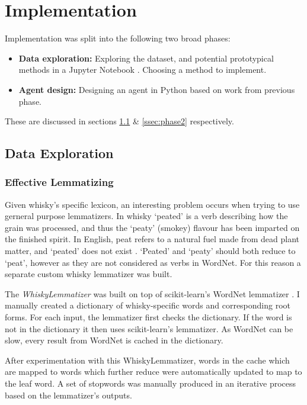 \section{Implementation}\label{sec:imp}

Implementation was split into the following two broad phases:
\begin{itemize}
    \item \textbf{Data exploration:} Exploring the dataset, and potential prototypical methods in 
    a Jupyter Notebook \cite{Kluyver2016jupyter}. Choosing a method to implement.
    \item \textbf{Agent design:} Designing an agent in Python based on work from previous phase.
\end{itemize}
These are discussed in sections \ref{ssec:phase1} \& \ref{ssec:phase2} respectively.

\subsection{Data Exploration}\label{ssec:phase1}
\subsubsection{Effective Lemmatizing}\label{words}
Given whisky's specific lexicon, an interesting problem occurs when trying to use gerneral purpose lemmatizers.
In whisky `peated' is a verb describing how the grain was processed, and thus the `peaty' (smokey) flavour has been 
imparted on the finished spirit.  In English, peat refers to a natural fuel made from dead plant matter,
and `peated' does not exist \cite{jenner_2019}. 
`Peated' and `peaty' should both reduce to `peat', however as they are not considered 
as verbs in WordNet.  For this reason a separate custom whisky lemmatizer was built.

The \emph{WhiskyLemmatizer} was built on top of scikit-learn's WordNet lemmatizer \cite{Barupal2011}. I manually created
a dictionary of whisky-specific words and corresponding root forms. For each input, the lemmatizer first checks the 
dictionary. If the word is not in the dictionary it then uses scikit-learn's lemmatizer. As WordNet can be slow,
every result from WordNet is cached in the dictionary.

After experimentation with this WhiskyLemmatizer, words in the cache which are mapped to words which further reduce
were automatically updated to map to the leaf word. A set of stopwords was manually produced in an 
iterative process based on the lemmatizer's outputs.

